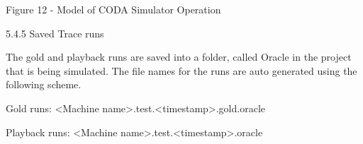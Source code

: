  
Figure 12 - Model of CODA Simulator Operation

5.4.5	Saved Trace runs

The gold and playback runs are saved into a folder, called Oracle in the project that is being simulated. The file names for the runs are auto generated using the following scheme.

Gold runs:
<Machine name>.test.<timestamp>.gold.oracle 

Playback runs:
<Machine name>.test.<timestamp>.oracle 


